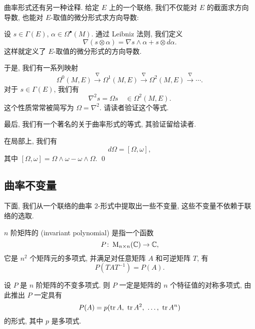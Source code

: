 曲率形式还有另一种诠释.
给定 $E$ 上的一个联络, 我们不仅能对 $E$ 的截面求方向导数,
也能对 $E$-取值的微分形式求方向导数:

\begin{definition}
    设 $s \in \Gamma (E)$, $\alpha \in \Omega^\bullet (M)$.
    通过 Leibniz 法则, 我们定义
    \[ \nabla ( s \otimes \alpha ) = \nabla s \wedge \alpha + s \otimes d \alpha. \]
    这样就定义了 $E$-取值的微分形式的方向导数.
\end{definition}

于是, 我们有一系列映射
\[ \Omega^0 (M, E) \overset{\nabla}{\longrightarrow}
    \Omega^1 (M, E) \overset{\nabla}{\longrightarrow} 
    \Omega^2 (M, E) \overset{\nabla}{\longrightarrow} \cdots. \]
对于 $s \in \Gamma (E)$, 我们有
\begin{equation} \label{eq-5-curv-nabla-sq}
    \nabla^2 s = \Omega s \quad \in \Omega^2 (M, E).
\end{equation}
这个性质常常被简写为 $\Omega = \nabla^2$. 请读者验证这个等式.

最后, 我们有一个著名的关于曲率形式的等式, 其验证留给读者.

\begin{proposition}  \label{thm-5-bianchi}
    在局部上, 我们有
    \[ d \Omega = [ \Omega, \omega ], \]
    其中 $[ \Omega, \omega ] = \Omega \wedge \omega - \omega \wedge \Omega$. \qed
\end{proposition}


\subsection{曲率不变量}

下面, 我们从一个联络的曲率 $2$-形式中提取出一些不变量,
这些不变量不依赖于联络的选取.

\begin{definition}
    $n$ 阶矩阵的 (invariant polynomial)
    是指一个函数
    \[ P \colon \operatorname{M}_{n \times n} (\mathbb{C}) \to \mathbb{C}, \]
    它是 $n^2$ 个矩阵元的多项式, 并满足对任意矩阵 $A$ 和可逆矩阵 $T$, 有
    \[ P (TAT^{-1}) = P(A). \]
\end{definition}

\begin{exercise} \label{ex-5-inv-poly}
    设 $P$ 是 $n$ 阶矩阵的不变多项式. 
    则 $P$ 一定是矩阵的 $n$ 个特征值的对称多项式,
    由此推出 $P$ 一定具有
    \[ P (A) = p ( \tr A, \ \tr A^2, \ \dotsc, \ \tr A^n ) \]
    的形式, 其中 $p$ 是多项式. \varqed
\end{exercise}

